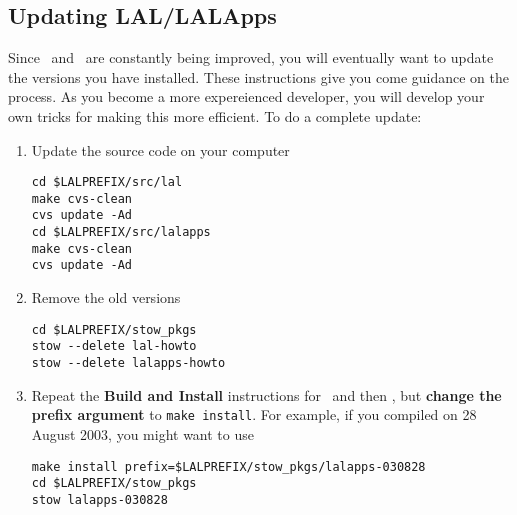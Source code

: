 \color{black}
\subsection{Updating LAL/LALApps}
\color{black}

Since \lal\ and \lalapps\ are constantly being improved,  you will
eventually want to update the versions you have installed.   These
instructions give you come guidance on the process.   As you become a
more expereienced developer,  you will develop your own tricks for
making this more efficient.    To do a complete update:
\begin{enumerate}
\item Update the source code on your computer
\begin{verbatim}
cd $LALPREFIX/src/lal
make cvs-clean
cvs update -Ad
cd $LALPREFIX/src/lalapps
make cvs-clean
cvs update -Ad
\end{verbatim}

\item Remove the old versions
\begin{verbatim}
cd $LALPREFIX/stow_pkgs
stow --delete lal-howto
stow --delete lalapps-howto
\end{verbatim}

\item Repeat the \textbf{Build and Install} instructions for \lal\ and then
\lalapps,  but \textbf{change the prefix argument} to \verb+make install+.   
For example,   if you compiled on 28 August 2003,  you might want to use
\begin{verbatim}
make install prefix=$LALPREFIX/stow_pkgs/lalapps-030828
cd $LALPREFIX/stow_pkgs
stow lalapps-030828
\end{verbatim}

\end{enumerate}

